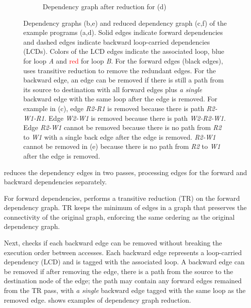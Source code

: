 \begin{figure}
\begin{subfigure}[b]{0.3\textwidth}
\caption{
  Dependency graph after reduction for (d)
}
\end{subfigure}
\caption[Examples for dependency graph reduction]{
  Dependency graphs (b,e) and reduced dependency graph (c,f) of the example programs (a,d).
  Solid edges indicate forward dependencies and
  dashed edges indicate backward loop-carried dependencies (LCDs).
  Colors of the LCD edges indicate the associated loop, \textcolor{pureblue}{blue} for loop \emph{A} and
  \textcolor{red}{red} for loop \emph{B}.
  For the forward edges (black edges), \name uses transitive reduction to remove the redundant
  edges.
  For the backward edge, an edge can be removed if there is still a path from its source to
  destination with all forward edges plus \emph{a single} backward edge with the same loop after the edge is
  removed.
  For example in (c), edge \emph{R2-R1} is removed because there is path \emph{R2-W1-R1}.
  Edge \emph{W2-W1} is removed because there is path \emph{W2-R2-W1}. 
  Edge \emph{R2-W1} cannot be removed because there is no path from \emph{R2} to \emph{W1} with a
  single back edge after the edge is removed.
  \emph{R2-W1} cannot be
  removed in (e) because there is no path from \emph{R2} to \emph{W1} after the edge is removed.
}
\label{fig:graphred}
\end{figure}

\name reduces the dependency edges in two passes, processing edges for the forward and backward dependencies separately.

For forward dependencies, \name performs a transitive reduction (TR)\cite{tr} on the forward dependency
graph. TR keeps the minimum of edges in a graph that preserves the connectivity of the original
graph, enforcing the same ordering as the original dependency graph.

Next, \name checks if each backward edge can be removed without breaking the execution order between
accesses. 
Each backward edge represents a loop-carried dependency (LCD) and is tagged with the associated loop.
A backward edge can be removed if after removing the edge, there is a path from the source to the
destination node of the edge; the path may contain any forward edges remained from the TR pass,
with \emph{a single} backward edge tagged with the same loop as the removed edge.
 shows examples of dependency graph reduction.

